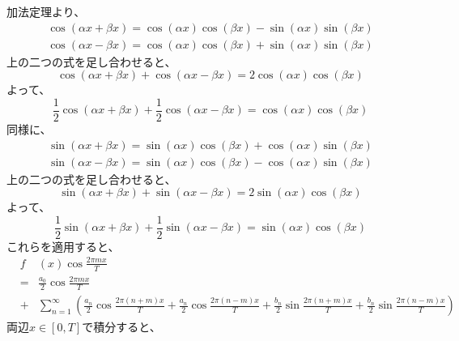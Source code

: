 \documentclass[a4paper]{jsarticle}
\begin{document}
加法定理より、
\begin{eqnarray}
	\cos( \alpha x + \beta x ) = \cos( \alpha x ) \cos( \beta x ) - \sin( \alpha x ) \sin( \beta x ) \nonumber \\
	\cos( \alpha x - \beta x ) = \cos( \alpha x ) \cos( \beta x ) + \sin( \alpha x ) \sin( \beta x ) \nonumber
\end{eqnarray}
上の二つの式を足し合わせると、
\begin{equation}
	\cos( \alpha x + \beta x ) + \cos( \alpha x - \beta x ) = 2 \cos( \alpha x ) \cos( \beta x )
\end{equation}
よって、
\begin{equation}
	\frac { 1 } { 2 } \cos( \alpha x + \beta x ) + \frac { 1 } { 2 } \cos( \alpha x - \beta x ) = \cos( \alpha x ) \cos( \beta x )
\end{equation}
同様に、
\begin{eqnarray}
	\sin( \alpha x + \beta x ) = \sin( \alpha x ) \cos( \beta x ) + \cos( \alpha x ) \sin( \beta x ) \nonumber \\
	\sin( \alpha x - \beta x ) = \sin( \alpha x ) \cos( \beta x ) - \cos( \alpha x ) \sin( \beta x ) \nonumber
\end{eqnarray}
上の二つの式を足し合わせると、
\begin{equation}
	\sin( \alpha x + \beta x ) + \sin( \alpha x - \beta x ) = 2 \sin( \alpha x ) \cos( \beta x )
\end{equation}
よって、
\begin{equation}
	\frac { 1 } { 2 } \sin( \alpha x + \beta x ) + \frac { 1 } { 2 } \sin( \alpha x - \beta x ) = \sin( \alpha x ) \cos( \beta x )
\end{equation}
これらを適用すると、
\begin{eqnarray}
	&f& \left( x \right) \cos \frac { 2 \pi mx } { T } \nonumber \\
	&=& \frac { a_0 } { 2 } \cos \frac { 2 \pi mx } { T } \nonumber \\
	&+& \sum _{ n = 1} ^\infty \left( \frac { a_n } { 2 } \cos \frac { 2 \pi \left( n + m \right) x } { T } + \frac { a_n } { 2 } \cos \frac { 2 \pi \left( n - m \right) x } { T } + \frac { b_n } { 2 } \sin \frac { 2 \pi \left( n + m \right) x } { T } + \frac { b_n } { 2 } \sin \frac { 2 \pi \left( n - m \right) x } { T } \right)
\end{eqnarray}
両辺$x \in \left[ 0,T \right]$で積分すると、
\end{document}
